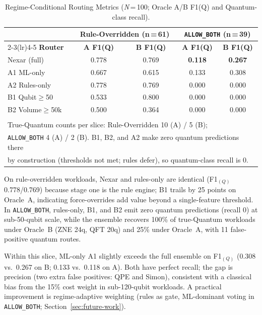 \documentclass[10pt,conference]{IEEEtran}
\begin{document}
\begin{table}[htbp]
\caption{Regime-Conditional Routing Metrics (\textit{N}\,=\,100; Oracle A/B F1(Q) and Quantum-class recall).}
\label{tab:regime-conditional}
\centering
\footnotesize
\setlength{\tabcolsep}{3pt}
\begin{tabular}{l cc cc}
\toprule
 & \multicolumn{2}{c}{\textbf{Rule-Overridden (n\,=\,61)}} & \multicolumn{2}{c}{\textbf{\texttt{ALLOW\_BOTH} (n\,=\,39)}} \\
\cmidrule(lr){2-3}\cmidrule(lr){4-5}
\textbf{Router} & \textbf{A F1(Q)} & \textbf{B F1(Q)} & \textbf{A F1(Q)} & \textbf{B F1(Q)} \\
\midrule
Nexar (full)      & 0.778 & 0.769 & \textbf{0.118} & \textbf{0.267} \\
A1 ML-only        & 0.667 & 0.615 & 0.133 & 0.308 \\
A2 Rules-only     & 0.778 & 0.769 & 0.000 & 0.000 \\
B1 Qubit$\geq$50  & 0.533 & 0.800 & 0.000 & 0.000 \\
B2 Volume$\geq$50k & 0.500 & 0.364 & 0.000 & 0.000 \\
\bottomrule
\\[-0.5em]
\multicolumn{5}{l}{\footnotesize True-Quantum counts per slice: Rule-Overridden 10 (A) / 5 (B);} \\
\multicolumn{5}{l}{\footnotesize \texttt{ALLOW\_BOTH} 4 (A) / 2 (B). B1, B2, and A2 make zero quantum predictions there} \\
\multicolumn{5}{l}{\footnotesize by construction (thresholds not met; rules defer), so quantum-class recall is 0.} \\
\end{tabular}
\end{table}

On rule-overridden workloads, Nexar and rules-only are identical (F1$_{(Q)}$ 0.778/0.769) because stage one is the rule engine; B1 trails by 25 points on Oracle~A, indicating force-overrides add value beyond a single-feature threshold. In \texttt{ALLOW\_BOTH}, rules-only, B1, and B2 emit zero quantum predictions (recall 0) at sub-50-qubit scale, while the ensemble recovers 100\% of true-Quantum workloads under Oracle~B (ZNE 24q, QFT 20q) and 25\% under Oracle~A, with 11 false-positive quantum routes.

Within this slice, ML-only A1 slightly exceeds the full ensemble on F1$_{(Q)}$ (0.308 vs.\ 0.267 on B; 0.133 vs.\ 0.118 on A). Both have perfect recall; the gap is precision (two extra false positives: QPE and Simon), consistent with a classical bias from the 15\% cost weight in sub-120-qubit workloads. A practical improvement is regime-adaptive weighting (rules as gate, ML-dominant voting in \texttt{ALLOW\_BOTH}; Section~\ref{sec:future-work}).
\end{document}
